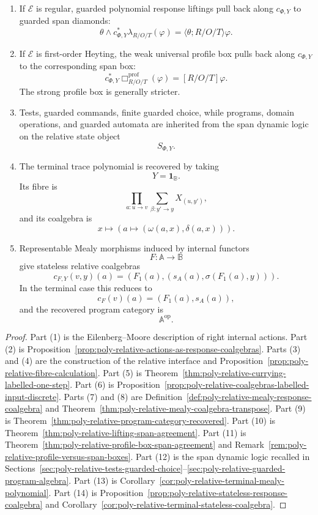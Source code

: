 \begin{theorem}
\begin{enumerate}
\item If \(\mathcal E\) is regular, guarded polynomial response liftings pull
back along \(c_{\Phi,Y}\) to guarded span diamonds:
\[
\theta\wedge c_{\Phi,Y}^{\ast}\lambda_{R/O/T}(\varphi)
=
\langle \theta;R/O/T\rangle\varphi.
\]

\item If \(\mathcal E\) is first-order Heyting, the weak universal profile box
pulls back along \(c_{\Phi,Y}\) to the corresponding span box:
\[
c_{\Phi,Y}^{\ast}
\Box^{\mathrm{prof}}_{R/O/T}(\varphi)
=
[R/O/T]\varphi.
\]
The strong profile box is generally stricter.

\item Tests, guarded commands, finite guarded choice, while programs, domain
operations, and guarded automata are inherited from the span dynamic logic on
the relative state object
\[
S_{\Phi,Y}.
\]

\item The terminal trace polynomial is recovered by taking
\[
Y=\mathbf 1_{\mathbb B}.
\]
Its fibre is
\[
\prod_{a:u\to v}
\sum_{\beta:y'\to y}
X_{(u,y')},
\]
and its coalgebra is
\[
x\longmapsto
\left(
a\longmapsto(\omega(a,x),\delta(a,x))
\right).
\]

\item Representable Mealy morphisms induced by internal functors
\[
F:\mathbb A\to\mathbb B
\]
give stateless relative coalgebras
\[
c_{F,Y}(v,y)(a)
=
\left(
F_1(a),
\left(
s_A(a),
\sigma(F_1(a),y)
\right)
\right).
\]
In the terminal case this reduces to
\[
c_F(v)(a)=(F_1(a),s_A(a)),
\]
and the recovered program category is
\[
\mathbb A^{\mathrm{op}}.
\]
\end{enumerate}
\end{theorem}

\begin{proof}
Part (1) is the Eilenberg--Moore description of right internal actions.
Part (2) is Proposition~\ref{prop:poly-relative-actions-as-response-coalgebras}.
Parts (3) and (4) are the construction of the relative interface and
Proposition~\ref{prop:poly-relative-fibre-calculation}.  Part (5) is
Theorem~\ref{thm:poly-relative-currying-labelled-one-step}.  Part (6) is
Proposition~\ref{prop:poly-relative-coalgebras-labelled-input-discrete}.  Parts
(7) and (8) are Definition~\ref{def:poly-relative-mealy-response-coalgebra}
and Theorem~\ref{thm:poly-relative-mealy-coalgebra-transpose}.  Part (9) is
Theorem~\ref{thm:poly-relative-program-category-recovered}.  Part (10) is
Theorem~\ref{thm:poly-relative-lifting-span-agreement}.  Part (11) is
Theorem~\ref{thm:poly-relative-profile-box-span-agreement} and
Remark~\ref{rem:poly-relative-profile-versus-span-boxes}.  Part (12) is the
span dynamic logic recalled in
Sections~\ref{sec:poly-relative-tests-guarded-choice}--\ref{sec:poly-relative-guarded-program-algebra}.
Part (13) is Corollary~\ref{cor:poly-relative-terminal-mealy-polynomial}.
Part (14) is Proposition~\ref{prop:poly-relative-stateless-response-coalgebra}
and Corollary~\ref{cor:poly-relative-terminal-stateless-coalgebra}.
\end{proof}


